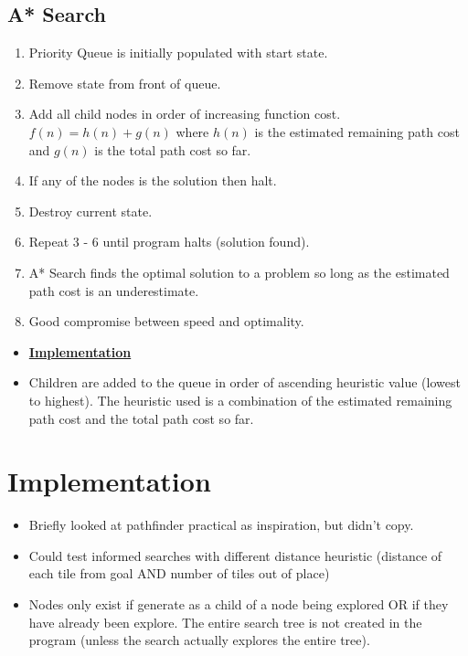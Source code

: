 \documentclass[12pt]{article}
\begin{document}
\subsection{A* Search}
\begin{enumerate}
	\item Priority Queue is initially populated with start state.
	\item Remove state from front of queue.
	\item Add all child nodes in order of increasing function cost. $f(n) = h(n) + g(n)$ where $h(n)$ is the estimated remaining path cost and $g(n)$ is the total path cost so far.
	\item If any of the nodes is the solution then halt.
	\item Destroy current state.
	\item Repeat 3 - 6 until program halts (solution found). \\[0.5cm]
	
	\item A* Search finds the optimal solution to a problem so long as the estimated path cost is an underestimate.
	\item Good compromise between speed and optimality. 
\end{enumerate}

\begin{itemize}
	\item \textbf{\underline{Implementation}}
	\item Children are added to the queue in order of ascending heuristic value (lowest to highest). The heuristic used is a combination of the estimated remaining path cost and the total path cost so far.
\end{itemize}


\section{Implementation}
\begin{itemize}
	\item Briefly looked at pathfinder practical as inspiration, but didn't copy.
	\item Could test informed searches with different distance heuristic (distance of each tile from goal AND number of tiles out of place)
	\item Nodes only exist if generate as a child of a node being explored OR if they have already been explore. The entire search tree is not created in the program (unless the search actually explores the entire tree).
\end{itemize}
\end{document}
